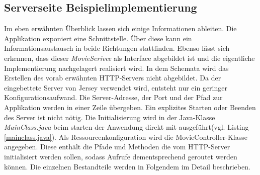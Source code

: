 \documentclass[fleqn,10.5pt,ngerman]{SelfArx}
\begin{document}
\subsection{Serverseite Beispielimplementierung}
Im eben erwähnten Überblick lassen sich einige Informationen ableiten. Die Applikation exponiert eine Schnittstelle. Über diese kann ein Informationsaustausch in beide Richtungen stattfinden. Ebenso lässt sich erkennen, dass dieser \textit{MovieSerivce} als Interface abgebildet ist und die eigentliche Implementierung nachgelagert realisiert wird. In dem Schemata wird das Erstellen des vorab erwähnten HTTP-Servers nicht abgebildet. Da der eingebettete Server von Jersey verwendet wird, entsteht nur ein geringer Konfigurationsaufwand.  Die Server-Adresse, der Port und der Pfad zur Applikation werden in einer Zeile übergeben. Ein explizites Starten oder Beenden des Server ist nicht nötig. Die Initialisierung wird in der Java-Klasse \textit{MainClass.java} beim starten der Anwendung direkt mit ausgeführt(vgl. Listing \ref{mainclass.java}). Als Ressourcenkonfiguration wird die MovieController-Klasse angegeben. Diese enthält die Pfade und Methoden die vom HTTP-Server initialisiert werden sollen, sodass Aufrufe dementsprechend geroutet werden können. Die einzelnen Bestandteile werden in Folgendem im Detail beschrieben.

\end{document}
